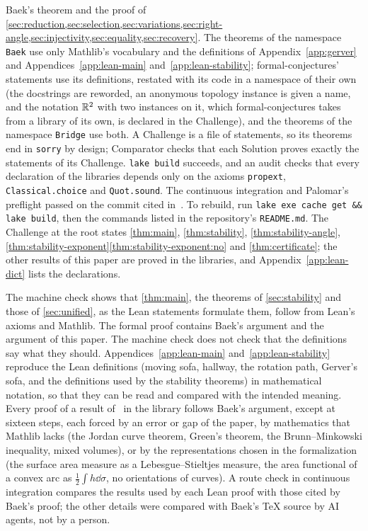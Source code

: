 Baek's theorem and the proof of
\cref{sec:reduction,sec:selection,sec:variations,sec:right-angle,sec:injectivity,sec:equality,sec:recovery}.
The theorems of the
namespace \texttt{Baek} use only Mathlib's vocabulary and the definitions of
Appendix~\ref{app:gerver} and Appendices~\ref{app:lean-main}
and~\ref{app:lean-stability}; formal-conjectures' statements use its
definitions, restated with its code in a namespace of their own (the docstrings
are reworded, an anonymous topology instance is given a name, and the notation
$\mathbb{R}^2$ with two instances on it, which formal-conjectures takes from a library of
its own, is declared in the Challenge), and the theorems of the namespace
\texttt{Bridge} use both. A Challenge is a file of statements, so its theorems
end in \texttt{sorry} by design; Comparator checks that each Solution proves
exactly the statements of its Challenge. \texttt{lake build} succeeds, and an
audit checks that every declaration of the libraries depends only on the axioms
\texttt{propext}, \texttt{Classical.choice} and \texttt{Quot.sound}.
The continuous integration and Palomar's preflight passed on the commit cited
in~\cite{Companion}. To rebuild, run \texttt{lake exe cache get \&\& lake build},
then the commands listed in the repository's \texttt{README.md}. The
Challenge at the root states \cref{thm:main}, \cref{thm:stability},
\cref{thm:stability-angle},
\cref{thm:stability-exponent}\ref{thm:stability-exponent:no} and
\cref{thm:certificate}; the other results
of this paper are proved in the libraries, and Appendix~\ref{app:lean-dict} lists the
declarations.

The machine check shows that \cref{thm:main}, the theorems of
\cref{sec:stability} and those of \cref{sec:unified}, as the Lean statements
formulate them, follow from Lean's axioms and Mathlib. The formal proof
contains Baek's argument and the argument of this paper. The machine check does
not check that the definitions say what
they should. Appendices~\ref{app:lean-main} and~\ref{app:lean-stability} reproduce the Lean
definitions (moving
sofa, hallway, the rotation path, Gerver's sofa, and the definitions used by the
stability theorems) in mathematical notation, so that they can be read and
compared with the intended meaning. Every proof of a result of~\cite{Baek} in
the library follows Baek's argument, except at sixteen steps, each forced by an
error or gap of the paper, by mathematics that Mathlib lacks (the Jordan curve
theorem, Green's theorem, the Brunn--Minkowski inequality, mixed volumes), or by
the representations chosen in the formalization (the surface area measure as a
Lebesgue--Stieltjes measure, the area functional of a convex arc as $\frac12\int
h\dd\sigma$, no orientations of curves). A route check in continuous integration
compares the results used by each Lean proof with those cited by Baek's proof;
the other details were compared with Baek's TeX source by AI agents, not by a
person.

